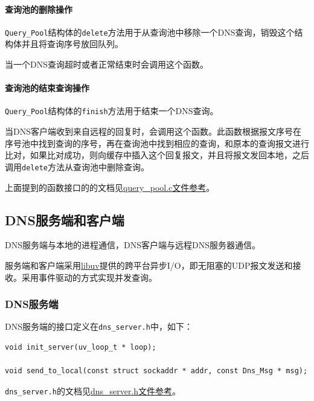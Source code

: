 \documentclass[lang=cn,11pt,a4paper,cite=authornum]{paper}
\begin{document}
\paragraph{查询池的删除操作}

\texttt{Query_Pool}结构体的\texttt{delete}方法用于从查询池中移除一个DNS查询，销毁这个结构体并且将查询序号放回队列。

当一个DNS查询超时或者正常结束时会调用这个函数。

\paragraph{查询池的结束查询操作}

\texttt{Query_Pool}结构体的\texttt{finish}方法用于结束一个DNS查询。

当DNS客户端收到来自远程的回复时，会调用这个函数。此函数根据报文序号在序号池中找到查询的序号，再在查询池中找到相应的查询，和原本的查询报文进行比对，如果比对成功，则向缓存中插入这个回复报文，并且将报文发回本地，之后调用\texttt{delete}方法从查询池中删除查询。

上面提到的函数接口的的文档见\href{run:./APIdoc/query__pool_8c.html}{query\_pool.c文件参考}。

\subsection{DNS服务端和客户端}

DNS服务端与本地的进程通信，DNS客户端与远程DNS服务器通信。

服务端和客户端采用\href{https://libuv.org/}{libuv}提供的跨平台异步I/O，即无阻塞的UDP报文发送和接收。采用事件驱动的方式实现并发查询。

\subsubsection{DNS服务端}

DNS服务端的接口定义在\texttt{dns_server.h}中，如下：

\begin{code}
\begin{verbatim}
void init_server(uv_loop_t * loop);

void send_to_local(const struct sockaddr * addr, const Dns_Msg * msg);
\end{verbatim}
\end{code}

\texttt{dns_server.h}的文档见\href{run:./APIdoc/dns__server_8h.html}{dns\_server.h文件参考}。
\end{document}
